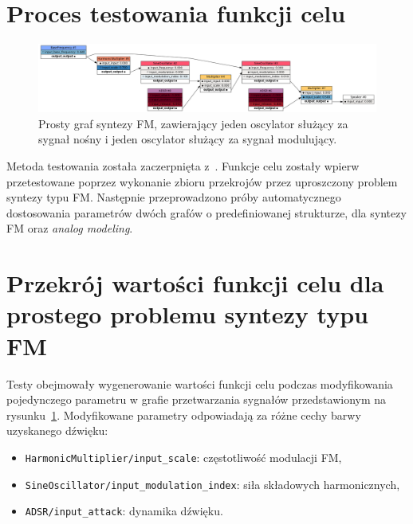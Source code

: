 \section{Proces testowania funkcji celu}

\begin{figure}[H]\label{fig:fm_graph_for_benchmarks}
    \centering
    \includegraphics[width=1.0\linewidth]{rys03/fm_graph_for_benchmarks.png}
    \caption{
      Prosty graf syntezy FM, zawierający jeden oscylator służący za sygnał nośny
      i jeden oscylator służący za sygnał modulujący.
    }
\end{figure}

Metoda testowania została zaczerpnięta z~\cite{evolutionary_puredata}.
Funkcje celu zostały wpierw przetestowane poprzez wykonanie
zbioru przekrojów przez uproszczony problem syntezy typu FM\@.
Następnie przeprowadzono próby automatycznego dostosowania parametrów dwóch grafów
o predefiniowanej strukturze, dla syntezy FM oraz \textit{analog modeling}.

\section{Przekrój wartości funkcji celu dla prostego problemu syntezy typu FM}\label{sec:fm_synth_params_cross_section}

Testy obejmowały wygenerowanie wartości funkcji celu podczas
modyfikowania pojedynczego parametru w grafie przetwarzania sygnałów
przedstawionym na rysunku~\ref{fig:fm_graph_for_benchmarks}.
Modyfikowane parametry odpowiadają za różne cechy barwy uzyskanego dźwięku:

\begin{itemize}
  \item \texttt{HarmonicMultiplier/input\_scale}: częstotliwość modulacji FM,
  \item \texttt{SineOscillator/input\_modulation\_index}: siła składowych harmonicznych,
  \item \texttt{ADSR/input\_attack}: dynamika dźwięku.
\end{itemize}


